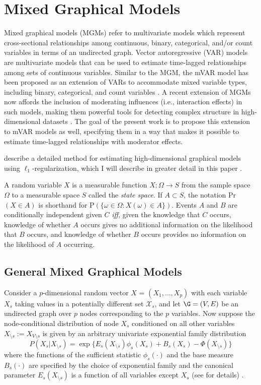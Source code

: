 \chapter{Mixed Graphical Models}
Mixed graphical models (MGMs) refer to multivariate models which represent cross-sectional relationships among continuous, binary, categorical, and/or count variables in terms of an undirected graph. Vector autoregressive (VAR) models are multivariate models that can be used to estimate time-lagged relationships among sets of continuous variables. Similar to the MGM, the mVAR model has been proposed as an extension of VARs to accommodate mixed variable types, including binary, categorical, and count variables \cite{haslbeck2015mgm}. A recent extension of MGMs now affords the inclusion of moderating influences (i.e., interaction effects) in such models, making them powerful tools for detecting complex structure in high-dimensional datasets \cite{haslbeck2018moderated}. The goal of the present work is to propose this extension to mVAR models as well, specifying them in a way that makes it possible to estimate time-lagged relationships with moderator effects.

\cite{wainwright2007high} describe a detailed method for estimating high-dimensional graphical models using $\ell_1$-regularization, which I will describe in greater detail in this paper \cite{wainwright2007high}. 

A random variable $X$ is a measurable function $X:\Omega\rightarrow S$ from the sample space $\Omega$ to a measurable space $S$ called the \textit{state space}. If $A \subset S$, the notation Pr$(X\in A)$ is shorthand for P$(\{\omega\in\Omega : X(\omega)\in A\})$. Events $A$ and $B$ are conditionally independent given $C$ \textit{iff}, given the knowledge that $C$ occurs, knowledge of whether $A$ occurs gives no additional information on the likelihood that $B$ occurs, and knowledge of whether $B$ occurs provides no information on the likelihood of $A$ occurring.

\section{General Mixed Graphical Models}
Consider a $p$-dimensional random vector $X$ = $(X_1, \ldots, X_p)$ with each variable $X_s$ taking values in a potentially different set $\mathcal{X}_s$, and let $\G = (V,E)$ be an undirected graph over $p$ nodes corresponding to the $p$ variables. Now suppose the node-conditional distribution of node $X_s$ conditioned on all other variables $X_{\setminus s} := X_{V \setminus s}$ is given by an arbitrary univariate exponential family distribution
\begin{equation} \label{nodeCond}
    P(X_s | X_{\setminus s}) = \exp\{E_s (X_{\setminus s}) \phi_s (X_s) + B_s (X_s) - \Phi (X_{\setminus s})\}
\end{equation}
where the functions of the sufficient statistic $\phi_s (\cdot)$ and the base measure $B_s (\cdot)$ are specified by the choice of exponential family and the canonical parameter $E_s (X_{\setminus s})$ is a function of all variables except $X_s$ (see for details) \cite{wainwright2008graphical}.

